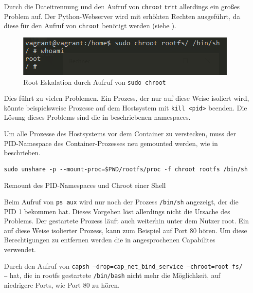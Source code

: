 Durch die Dateitrennung und den Aufruf von \texttt{chroot} tritt allerdings ein großes Problem auf. Der Python-Webserver wird mit erhöhten Rechten ausgeführt, da diese für den Aufruf von \texttt{chroot} benötigt werden (siehe ).

\begin{figure}[h]
	\begin{center}
		\includegraphics[scale=1]{bilder/chroot-whoami-root.png}
		\caption{Root-Eskalation durch Aufruf von \texttt{sudo chroot}}
		\label{fig:chrootWhoami}
	\end{center}
\end{figure}

Dies führt zu vielen Problemen. Ein Prozess, der nur auf diese Weise isoliert wird, könnte beispielsweise Prozesse auf dem Hostsystem mit \texttt{kill <pid>} beenden. Die Lösung dieses Problems sind die in  beschriebenen namespaces.

Um alle Prozesse des Hostsystems vor dem Container zu verstecken, muss der PID-Namespace des Container-Prozesses neu gemounted werden, wie in  beschrieben.
\begin{listing}[h]
	\begin{verbatim}
sudo unshare -p --mount-proc=$PWD/rootfs/proc -f chroot rootfs /bin/sh
	\end{verbatim}
	\caption{Remount des PID-Namespaces und Chroot einer Shell}
	\label{lst:unshareRemount}
\end{listing}

Beim Aufruf von \glqq \texttt{ps aux}\grqq{} wird nur noch der Prozess \texttt{/bin/sh} angezeigt, der die PID 1 bekommen hat. Dieses Vorgehen löst allerdings nicht die Ursache des Problems. Der gestartete Prozess läuft auch weiterhin unter dem Nutzer root. Ein auf diese Weise isolierter Prozess, kann zum Beispiel auf Port 80 hören. Um diese Berechtigungen zu entfernen werden die in  angesprochenen Capabilites verwendet.

Durch den Aufruf von \texttt{capsh --drop=cap_net_bind_service --chroot=root fs/ --} hat, die in rootfs gestartete \texttt{/bin/bash} nicht mehr die Möglichkeit, auf niedrigere Ports, wie Port 80 zu hören.



